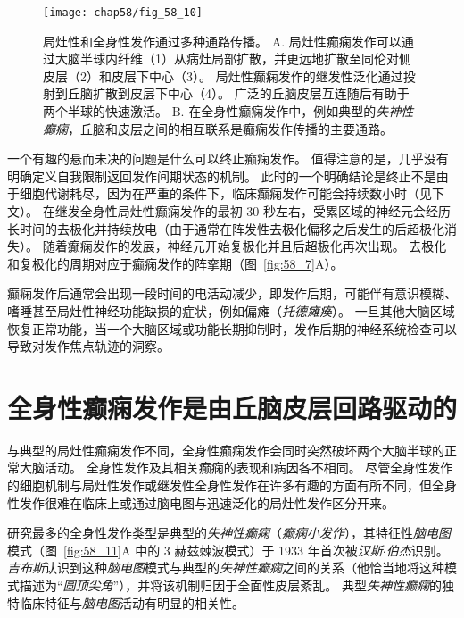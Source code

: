 \begin{figure}[htbp]
	\centering
	\texttt{[image: chap58/fig\_58\_10]}
	\caption{局灶性和全身性发作通过多种通路传播\cite{lothman1993pathophysiology}。
		A. 局灶性癫痫发作可以通过大脑半球内纤维（1）从病灶局部扩散，并更远地扩散至同伦对侧皮层（2）和皮层下中心（3）。
		局灶性癫痫发作的继发性泛化通过投射到丘脑扩散到皮层下中心（4）。
		广泛的丘脑皮层互连随后有助于两个半球的快速激活。
		B. 在全身性癫痫发作中，例如典型的\textit{失神性癫痫}，丘脑和皮层之间的相互联系是癫痫发作传播的主要通路。}
	\label{fig:58_10}
\end{figure}


一个有趣的悬而未决的问题是什么可以终止癫痫发作。
值得注意的是，几乎没有明确定义自我限制返回发作间期状态的机制。
此时的一个明确结论是终止不是由于细胞代谢耗尽，因为在严重的条件下，临床癫痫发作可能会持续数小时（见下文）。
在继发全身性局灶性癫痫发作的最初 30 秒左右，受累区域的神经元会经历长时间的去极化并持续放电（由于通常在阵发性去极化偏移之后发生的后超极化消失）。
随着癫痫发作的发展，神经元开始复极化并且后超极化再次出现。
去极化和复极化的周期对应于癫痫发作的阵挛期（图~\ref{fig:58_7}A）。


癫痫发作后通常会出现一段时间的电活动减少，即发作后期，可能伴有意识模糊、嗜睡甚至局灶性神经功能缺损的症状，例如偏瘫（\textit{托德瘫痪}）。
一旦其他大脑区域恢复正常功能，当一个大脑区域或功能长期抑制时，发作后期的神经系统检查可以导致对发作焦点轨迹的洞察。



\section{全身性癫痫发作是由丘脑皮层回路驱动的}

与典型的局灶性癫痫发作不同，全身性癫痫发作会同时突然破坏两个大脑半球的正常大脑活动。
全身性发作及其相关癫痫的表现和病因各不相同。
尽管全身性发作的细胞机制与局灶性发作或继发性全身性发作在许多有趣的方面有所不同，但全身性发作很难在临床上或通过脑电图与迅速泛化的局灶性发作区分开来。


研究最多的全身性发作类型是典型的\textit{失神性癫痫}（\textit{癫痫小发作}），其特征性\textit{脑电图}模式（图~\ref{fig:58_11}A 中的 3 赫兹棘波模式）于 1933 年首次被\textit{汉斯$\cdot$伯杰}识别。
\textit{吉布斯}认识到这种\textit{脑电图}模式与典型的\textit{失神性癫痫}之间的关系（他恰当地将这种模式描述为“\textit{圆顶尖角}”），并将该机制归因于全面性皮层紊乱。
典型\textit{失神性癫痫}的独特临床特征与\textit{脑电图}活动有明显的相关性。


